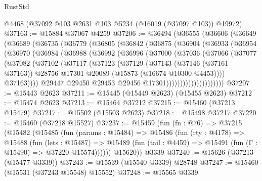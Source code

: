 \begin{lexlean}{RustStd}
\begin{coremodule}
    @4468
    (@37092 @103 @2631 @103 @5234 (@16019 (@37097 @103)) @19972)
@37163 := @15884 @37067 @4259
@37206 := @36494
    (@36555
      (@36606
        (@36649
          (@36689
            (@36735
              (@36779
                (@36805
                  (@36842
                    (@36875
                      (@36904
                        (@36933
                          (@36954
                            (@36970
                              (@36984
                                (@36988
                                  (@36992
                                    (@36996
                                      (@37000
                                        (@37036
                                          (@37066
                                            (@37077
                                              (@37082
                                                (@37102
                                                  (@37117
                                                    (@37123
                                                      (@37129
                                                        (@37143
                                                          (@37146 (@37161 @37163))
                                                          @28756
                                                          @17301
                                                          @20089
                                                          (@15873 (@16674 @10300 @4453))))
                                                      @37163))))
                                              @29447
                                              @29450
                                              @29453
                                              @29456
                                              @17301)))))))))))))))))))))
@37207 := @15443 @2623
@37211 := @15445 (@15449 @2623) (@15455 @2623)
@37212 := @15474 @2623
@37213 := @15464 @37212
@37215 := @15460 (@37213 @15479)
@37217 := @15502 (@15503 @2623)
@37218 := @15498 @37217
@37220 := @15460 (@37218 @15527)
@37237 := @15459
    (fun (fn : @76) =>
    @37215
      (@15482
        (@15485
          (fun (params : @15484) =>
          @15486
            (fun (rty : @4178) =>
            @15488
              (fun (lets : @15487) =>
              @15489 (fun (tail : @4459) => @15491 (fun (Γ : @15490) => @37220 @15574))))))
        @15620))
    @3339
@37240 := @15626 (@37213 (@15477 @3339))
@37243 := @15539 (@15540 @3339) @28748
@37247 := @15460 (@15531 (@37243 @15548) @15552)
@37248 := @15565 @3339

\end{coremodule}
\end{lexlean}
